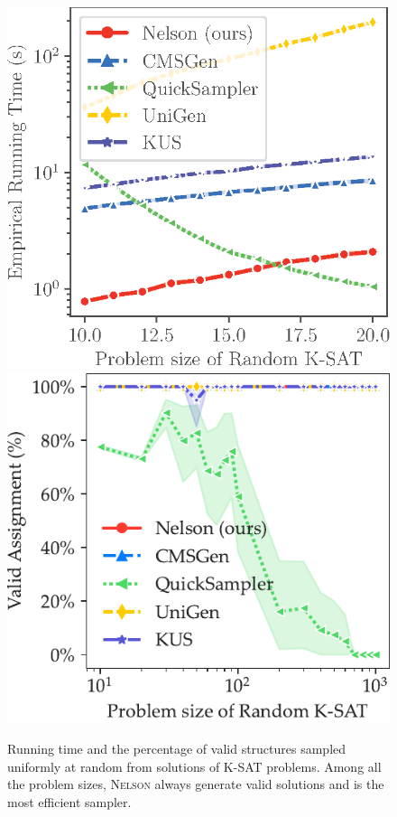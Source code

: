 \documentclass[letterpaper]{article} %
\newcommand{\nls}{\textsc{Nelson}\xspace}
\begin{document}
\begin{figure}[!t]
    \centering
    \includegraphics[width=0.49\linewidth]{exp/sat/sampling.randkcnf.uniform.time.eps}
    \includegraphics[width=0.50\linewidth]{exp/sat/sampling.randkcnf.valid.pdf}
    \caption{Running time and the percentage of valid structures sampled  uniformly at random from solutions of K-SAT problems. {Among all the problem sizes}, \nls always generate valid solutions  and is the most efficient sampler.}
    \label{fig:uniform_sample}
\end{figure}
\end{document}
